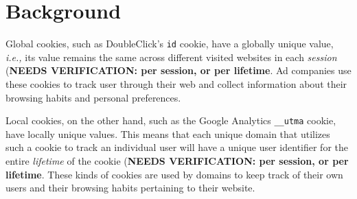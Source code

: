 \section{Background}
\label{sec:background}

Global cookies, such as DoubleClick's \texttt{id} cookie, have a globally unique value, \emph{i.e.,} its value remains the same across different visited websites in each \emph{session} (\textbf{NEEDS VERIFICATION: per session, or per lifetime}. 
Ad companies use these cookies to track user through their web and collect information about their browsing habits and personal preferences.

Local cookies, on the other hand, such as the Google Analytics \texttt{\_\_utma} cookie, have locally unique values.
This means that each unique domain that utilizes such a cookie to track an individual user will have a unique user identifier for the entire \emph{lifetime} of the cookie (\textbf{NEEDS VERIFICATION: per session, or per lifetime}.
These kinds of cookies are used by domains to keep track of their own users and their browsing habits pertaining to their website. 
